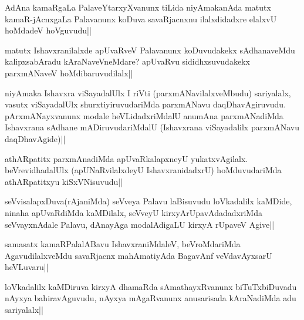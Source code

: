 \begin{artha}
AdAna kamaRgaLa PalaveYtarxyXvanunx tiLida niyAmakanAda matutx kamaR-jAcnxgaLa Palavanunx koDuva savaRjacnxnu ilalxdidadxre elalxvU hoMdadeV hoVguvudu||
\end{artha}


\begin{artha}
matutx Ishavxranilalxde apUvaRveV Palavanunx koDuvudakekx sAdhanaveMdu kalipxsabAradu kAraNaveVneMdare? apUvaRvu sididhxsuvudakekx parxmANaveV hoMdibaruvudilalx||
\end{artha}

\begin{artha}%
niyAmaka Ishavxra viSayadalUlx I riVti (parxmANavilalxveMbudu) sariyalalx, vasutx viSayadalUlx shurxtiyiruvudariMda parxmANavu daqDhavAgiruvudu. pArxmANayxvanunx modale heVLidadxriMdalU anumAna parxmANadiMda Ishavxrana sAdhane mADiruvudariMdalU (Ishavxrana viSayadalilx parxmANavu daqDhavAgide)||
\end{artha}

\begin{artha}
athARpatitx parxmAnadiMda apUvaRkalapxneyU yukatxvAgilalx. beVrevidhadalUlx (apUNaRvilalxdeyU IshavxranidadxrU) hoMduvudariMda athARpatitxyu kiSxVNisuvudu||
\end{artha}

\begin{artha}
seVvisalapxDuva(rAjaniMda) seVveya Palavu laBisuvudu loVkadalilx kaMDide, ninaha apUvaRdiMda kaMDilalx, seVveyU kirxyArUpavAdadadxriMda seVvayxnAdale Palavu, dAnayAga modalAdigaLU kirxyA rUpaveV Agive||
\end{artha}


\begin{artha}%
samasatx kamaRPalalABavu IshavxraniMdaleV, beVroMdariMda AgavudilalxveMdu savaRjacnx mahAmatiyAda BagavAnf veVdavAyxsarU heVLuvaru||
\end{artha}


\begin{artha}
loVkadalilx kaMDiruva kirxyA dhamaRda sAmathayxRvanunx biTuTxbiDuvadu nAyxya bahiravAguvudu, nAyxya mAgaRvanunx anusarisada kAraNadiMda adu sariyalalx||
\end{artha}

